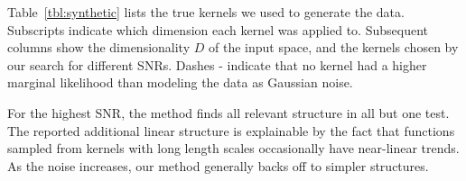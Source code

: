 


Table~\ref{tbl:synthetic} lists the true kernels we used to generate the data.  Subscripts indicate which dimension each kernel was applied to.  Subsequent columns show the dimensionality $D$ of the input space, and the kernels chosen by our search for different SNRs.
Dashes - indicate that no kernel had a higher marginal likelihood than modeling the data as \iid Gaussian noise. %

For the highest SNR, the method finds all relevant structure in all but one test.
The reported additional linear structure is explainable by the fact that functions sampled from \kSE{} kernels with long length scales occasionally have near-linear trends.
%
As the noise increases, our method generally backs off to simpler structures.

